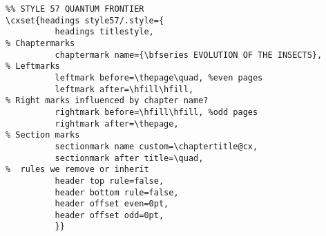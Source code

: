 \makeatother






\begin{tcolorbox}
\begin{lstlisting}
%% STYLE 57 QUANTUM FRONTIER
\cxset{headings style57/.style={
          headings titlestyle,
% Chaptermarks
          chaptermark name={\bfseries EVOLUTION OF THE INSECTS},
% Leftmarks
          leftmark before=\thepage\quad, %even pages
          leftmark after=\hfill\hfill,
% Right marks influenced by chapter name?
          rightmark before=\hfill\hfill, %odd pages
          rightmark after=\thepage,
% Section marks
          sectionmark name custom=\chaptertitle@cx,
          sectionmark after title=\quad,
%  rules we remove or inherit
          header top rule=false,
          header bottom rule=false,
          header offset even=0pt,
          header offset odd=0pt,
          }}
\end{lstlisting}
\end{tcolorbox}


